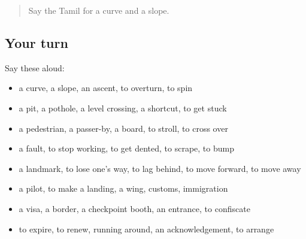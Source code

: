 \begin{quote}
Say the Tamil for a curve and a slope.
\end{quote}

\subsection*{Your turn}
Say these aloud:

\begin{itemize}
\raggedright
  \item a curve, a slope, an ascent, to overturn, to spin
  \item a pit, a pothole, a level crossing, a shortcut, to get stuck
  \item a pedestrian, a passer-by, a board, to stroll, to cross over
  \item a fault, to stop working, to get dented, to scrape, to bump
  \item a landmark, to lose one's way, to lag behind, to move forward, to move away
  \item a pilot, to make a landing, a wing, customs, immigration
  \item a visa, a border, a checkpoint booth, an entrance, to confiscate
  \item to expire, to renew, running around, an acknowledgement, to arrange
\end{itemize}

